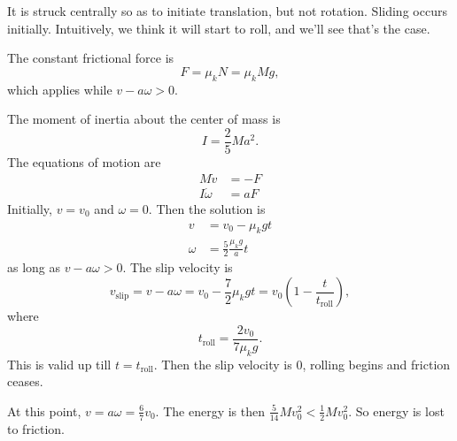 \documentclass[a4paper]{article}
\begin{document}
\begin{eg}\leavevmode
  \begin{center}
  \end{center}
  It is struck centrally so as to initiate translation, but not rotation. Sliding occurs initially. Intuitively, we think it will start to roll, and we'll see that's the case.

  The constant frictional force is
  \[
    F = \mu_k N = \mu_k Mg,
  \]
  which applies while $v - a\omega > 0$.

  The moment of inertia about the center of mass is
  \[
    I = \frac{2}{5}Ma^2.
  \]
  The equations of motion are
  \begin{align*}
    M\dot{v} &= -F\\
    I\dot\omega &= aF
  \end{align*}
  Initially, $v = v_0$ and $\omega = 0$. Then the solution is
  \begin{align*}
    v &= v_0 - \mu_k gt\\
    \omega &= \frac{5}{2} \frac{\mu_k g}{a}t
  \end{align*}
  as long as $v - a \omega > 0$. The slip velocity is
  \[
    v_{\mathrm{slip}} = v - a\omega = v_0 - \frac{7}{2}\mu_k gt = v_0  \left(1 - \frac{t}{t_\mathrm{roll}}\right),
  \]
  where
  \[
    t_{\mathrm{roll}} = \frac{2v_0}{7\mu_k g}.
  \]
  This is valid up till $t = t_{\mathrm{roll}}$. Then the slip velocity is 0, rolling begins and friction ceases.

  At this point, $v = a\omega = \frac{6}{7}v_0$. The energy is then $\frac{5}{14}Mv_0^2 < \frac{1}{2}Mv_0^2$. So energy is lost to friction.
\end{eg}
\end{document}
